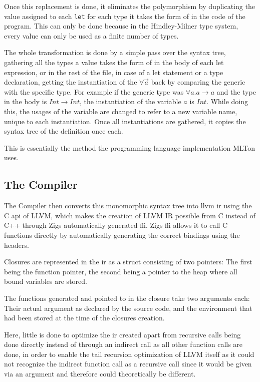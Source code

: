 \documentclass[12pt]{article}
\begin{document}
Once this replacement is done, it eliminates the polymorphism by duplicating
the value assigned to each \texttt{let} for each type it takes the form of
in the code of the program. This can only be done because
in the Hindley-Milner type system, every value
can only be used as a finite number of types.

The whole transformation is done by a simple pass over the syntax tree, gathering
all the types a value takes the form of in the body of each let expression,
or in the rest of the file, in case of a let statement or a type declaration,
getting the instantiation of the $\forall\vec{a}$ back by comparing the generic
with the specific type. For example if the generic type was $\forall a. a \rightarrow a$ and
the type in the body is $Int \rightarrow Int$, the instantiation of the variable $a$ is $Int$.
While doing this, the usages of the variable are changed to refer to a new variable name,
unique to each instantiation.
Once all instantiations are gathered, it copies the syntax tree of the definition once each.

This is essentially the method the programming language implementation MLTon uses.\autocite{Monomorphise}

\subsection{The Compiler}
The Compiler then converts this
monomorphic syntax tree into \Gls{llvm} \Gls{ir} using the C \Gls{api} of LLVM, which
makes the creation of LLVM IR possible from C instead of C++ through
Zigs automatically generated \Gls{ffi}. Zigs \Gls{ffi} allows it to call
C functions directly by automatically generating the correct bindings using the
headers.

Closures are represented in the \Gls{ir} as a struct consisting of two pointers:
The first being the function pointer, the second being a pointer to the heap
where all bound variables are stored.

The functions generated and pointed to in the closure
take two arguments each: Their actual argument
as declared by the source code, and the environment that had been stored
at the time of the closures creation.

Here, little is done to optimize the \Gls{ir} created apart
from recursive calls being done directly instead of through an indirect
call as all other function calls are done, in order to enable
the tail recursion optimization of LLVM itself as it could not recognize the indirect function call
as a recursive call since it would be given via an argument and therefore
could theoretically be different.
\end{document}
